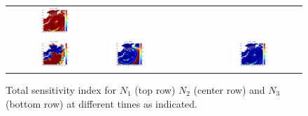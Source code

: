 \begin{figure}[h]
\begin{tabular}{clc}
\hspace*{-65pt}
\includegraphics[width=0.45\textwidth]{./figures/T22d4.pdf} \\
\hspace*{-65pt}
\includegraphics[width=0.45\textwidth]{./figures/T32d1.pdf} &
\hspace*{-65pt}
\includegraphics[width=0.45\textwidth]{./figures/T32d3.pdf} &
\hspace*{-65pt}
\includegraphics[width=0.45\textwidth]{./figures/T32d4.pdf}
\end{tabular}
\caption{Total sensitivity index for $N_1$ (top row) $N_2$ (center row) and $N_3$ (bottom row)
 at different times as indicated.}
\label{fig:sens2d}
\end{figure}
